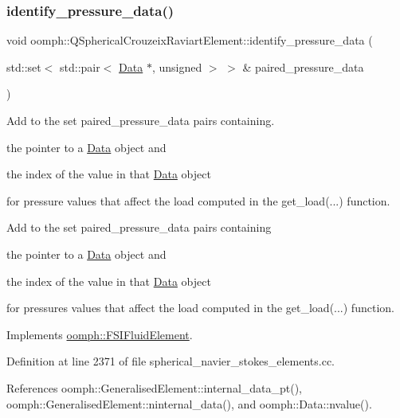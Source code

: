 \subsubsection{\texorpdfstring{identify\+\_\+pressure\+\_\+data()}{identify\_pressure\_data()}}
{\footnotesize\ttfamily void oomph\+::\+Q\+Spherical\+Crouzeix\+Raviart\+Element\+::identify\+\_\+pressure\+\_\+data (\begin{DoxyParamCaption}\item[{std\+::set$<$ std\+::pair$<$ \hyperlink{classoomph_1_1Data}{Data} $\ast$, unsigned $>$ $>$ \&}]{paired\+\_\+pressure\+\_\+data }\end{DoxyParamCaption})\hspace{0.3cm}{\ttfamily [virtual]}}



Add to the set {\ttfamily paired\+\_\+pressure\+\_\+data} pairs containing. 


\begin{DoxyItemize}
\item the pointer to a \hyperlink{classoomph_1_1Data}{Data} object and
\item the index of the value in that \hyperlink{classoomph_1_1Data}{Data} object
\end{DoxyItemize}for pressure values that affect the load computed in the {\ttfamily get\+\_\+load}(...) function.

Add to the set {\ttfamily paired\+\_\+pressure\+\_\+data} pairs containing
\begin{DoxyItemize}
\item the pointer to a \hyperlink{classoomph_1_1Data}{Data} object and
\item the index of the value in that \hyperlink{classoomph_1_1Data}{Data} object
\end{DoxyItemize}for pressures values that affect the load computed in the {\ttfamily get\+\_\+load}(...) function. 

Implements \hyperlink{classoomph_1_1FSIFluidElement_af8e0805b769b7d111eb71f223fc83df8}{oomph\+::\+F\+S\+I\+Fluid\+Element}.



Definition at line 2371 of file spherical\+\_\+navier\+\_\+stokes\+\_\+elements.\+cc.



References oomph\+::\+Generalised\+Element\+::internal\+\_\+data\+\_\+pt(), oomph\+::\+Generalised\+Element\+::ninternal\+\_\+data(), and oomph\+::\+Data\+::nvalue().



